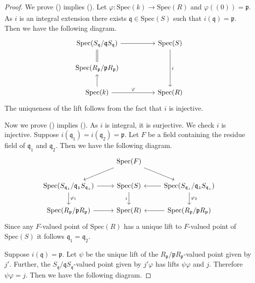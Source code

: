 \documentclass[11pt,a4paper]{amsart}
\theoremstyle{plain}
\theoremstyle{definition}
\theoremstyle{remark}
\begin{document}
\iffalse
\begin{proof}
We prove ()  implies (). Let $\varphi: \text{Spec}(k)\xrightarrow[]{}\text{Spec}(R)$ and $\varphi((0))=\mathfrak{p}$. As $i$ is an integral extension there exists $\mathfrak{q}\in \text{Spec}(S)$ such that $i(\mathfrak{q})=\mathfrak{p}$. Then we have the following diagram.
    \[\begin{tikzcd}
	{\operatorname{Spec}(S_{\mathfrak{q}}/\mathfrak{q}S_\mathfrak{q})} && {\operatorname{Spec}(S)} \\
	{\operatorname{Spec}(R_{\mathfrak{p}}/\mathfrak{p}R_\mathfrak{p})} \\
	{\operatorname{Spec}(k)} && {\operatorname{Spec}(R)}
	\arrow[from=1-1, to=1-3]
	\arrow[equals, from=1-1, to=2-1]
	\arrow["i", from=1-3, to=3-3]
	\arrow[from=3-1, to=2-1]
	\arrow["\varphi", from=3-1, to=3-3]
\end{tikzcd}\]
 The uniqueness of the lift follows from the fact that $i$ is injective.

 
Now we prove  () implies  (). As $i$ is integral, it is surjective. We check $i$ is injective. Suppose $i(\mathfrak{q}_1)=i(\mathfrak{q}_2)=\mathfrak{p}.$ Let $F$ be a field containing the residue field of $\mathfrak{q}_1$ and $\mathfrak{q}_2$. Then we have the following diagram. 
 \[\begin{tikzcd}
	& {\operatorname{Spec}(F)} \\
	{\operatorname{Spec}(S_{\mathfrak{q_1}}/\mathfrak{q_1}S_\mathfrak{q_1})} & {\operatorname{Spec}(S)} & {\operatorname{Spec}(S_{\mathfrak{q_2}}/\mathfrak{q_2}S_\mathfrak{q_2})} \\
	{\operatorname{Spec}(R_{\mathfrak{p}}/\mathfrak{p}R_\mathfrak{p})} & {\operatorname{Spec}(R)} & {\operatorname{Spec}(R_{\mathfrak{p}}/\mathfrak{p}R_\mathfrak{p})}
	\arrow[from=1-2, to=2-1]
	\arrow[from=1-2, to=2-3]
	\arrow[from=2-1, to=2-2]
	\arrow["{\varphi_1}", from=2-1, to=3-1]
	\arrow["i"', from=2-2, to=3-2]
	\arrow[from=2-3, to=2-2]
	\arrow["{\varphi_2}", from=2-3, to=3-3]
	\arrow[from=3-1, to=3-2]
	\arrow[from=3-3, to=3-2]
\end{tikzcd}\]
Since any $F$-valued point of $\text{Spec}(R)$ has a unique lift to $F$-valued point of $\text{Spec}(S)$ it follows $\mathfrak{q}_1=\mathfrak{q}_2$.

Suppose $i(\mathfrak{q})=\mathfrak{p}$. Let $\psi$ be the unique lift of the $R_{\mathfrak{p}}/\mathfrak{p}R_\mathfrak{p}$-valued point given by $j'$. Further, the $S_{\mathfrak{q}}/\mathfrak{q}S_\mathfrak{q}$-valued point given by $j'\varphi$ has lifts $\psi\varphi$ and $j$. Therefore $\psi\varphi=j$. Then we have the following diagram.


\end{proof}
\end{document}
